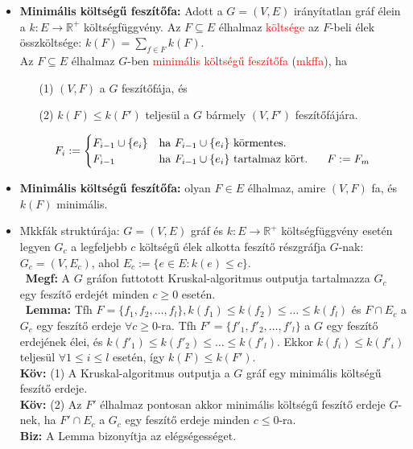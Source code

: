 \documentclass[../../szobeli.tex]{subfiles}
\begin{document}
    \begin{center}
        \noindent{}
    \end{center}

    \begin{itemize}
        \item \textbf{Minimális költségű feszítőfa:} Adott a $G = (V,E)$ irányítatlan gráf élein a $k:E \rightarrow \mathbb{R}^+$ költségfüggvény. Az $F \subseteq E$ élhalmaz \textcolor{red}{költsége} az $F$-beli élek összköltsége: $k(F) = \sum_{f\in F}k(F)$. \\ Az $F \subseteq E$ élhalmaz $G$-ben \textcolor{red}{minimális költségű feszítőfa} (\textcolor{red}{mkffa}), ha \begin{itemize}
            \item[(1)] $(V,F)$ a $G$ feszítőfája, és
            \item[(2)] $k(F) \leq k(F')$ teljesül a $G$ bármely $(V,F')$ feszítőfájára.
        \end{itemize}
        \begin{equation*}
            F_i :=\begin{cases}
                F_{i-1}\cup \{e_i\} & \text{ha $F_{i-1}\cup \{e_i\}$ körmentes.} \\
                F_{i-1} & \text{ha $F_{i-1}\cup \{e_i\}$ tartalmaz kört. \;\;\; $F:=F_m$}
            \end{cases}
        \end{equation*}
        \item \textbf{Minimális költségű feszítőfa:} olyan $F\in E$ élhalmaz, amire $(V,F)$ fa, és $k(F)$ minimális.
        \item Mkkfák struktúrája: $G=(V,E)$ gráf és $k:E \rightarrow \mathbb{R}^+$ költségfüggvény esetén legyen $G_c$ a legfeljebb $c$ költségű élek alkotta feszítő részgráfja $G$-nak: $G_c = (V,E_c)$, ahol $E_c := \{e \in E : k(e)\leq c\}$. \\ \textbf{Megf:} A $G$ gráfon futtotott Kruskal-algoritmus outputja tartalmazza $G_c$ egy feszítő erdejét minden $c \geq 0$ esetén. \\ \textbf{Lemma:} Tfh $F=\{f_1,f_2,\dots,f_l\}, k(f_1) \leq k(f_2) \leq \dots \leq k(f_l)$ és $F\cap E_c$ a $G_c$ egy feszítő erdeje $\forall c \geq 0$-ra. Tfh $F' = \{f'_1, f'_2,\dots,f'_l\}$ a $G$ egy feszítő erdejének élei, és $k(f'_1) \leq k(f'_2) \leq \dots \leq k(f'_l)$. Ekkor $k(f_i) \leq k(f'_i)$ teljesül $\forall 1 \leq i \leq l$ esetén, így $k(F) \leq k(F')$. \\ \textbf{Köv:} (1) A Kruskal-algoritmus outputja a $G$ gráf egy minimális költségű feszítő erdeje. \\ \textbf{Köv:} (2) Az $F'$ élhalmaz pontosan akkor minimális költségű feszítő erdeje $G$-nek, ha $F' \cap E_c$ a $G_c$ egy feszítő erdeje minden $c \leq 0$-ra. \\ \textbf{Biz:} A Lemma bizonyítja az elégségességet.

\end{itemize}
\end{document}
